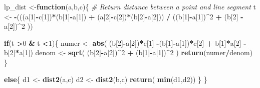 \documentclass[
]{article}
\newenvironment{Shaded}{\begin{snugshade}}{\end{snugshade}}
\newcommand{\CommentTok}[1]{\textcolor[rgb]{0.56,0.35,0.01}{\textit{#1}}}
\newcommand{\ControlFlowTok}[1]{\textcolor[rgb]{0.13,0.29,0.53}{\textbf{#1}}}
\newcommand{\DecValTok}[1]{\textcolor[rgb]{0.00,0.00,0.81}{#1}}
\newcommand{\KeywordTok}[1]{\textcolor[rgb]{0.13,0.29,0.53}{\textbf{#1}}}
\newcommand{\NormalTok}[1]{#1}
\newcommand{\OperatorTok}[1]{\textcolor[rgb]{0.81,0.36,0.00}{\textbf{#1}}}
\newcommand{\StringTok}[1]{\textcolor[rgb]{0.31,0.60,0.02}{#1}}
\begin{document}
\begin{Shaded}
\begin{Highlighting}[]
{\NormalTok{     lp_dist <-}\ControlFlowTok{function}\NormalTok{(a,b,c)\{ }
                               \CommentTok{# Return distance between a point and line segment }
\NormalTok{                               t <-}\StringTok{ }\OperatorTok{-}\NormalTok{(((a[}\DecValTok{1}\NormalTok{]}\OperatorTok{-}\NormalTok{c[}\DecValTok{1}\NormalTok{])}\OperatorTok{*}\NormalTok{(b[}\DecValTok{1}\NormalTok{]}\OperatorTok{-}\NormalTok{a[}\DecValTok{1}\NormalTok{]) }\OperatorTok{+}\StringTok{ }\NormalTok{(a[}\DecValTok{2}\NormalTok{]}\OperatorTok{-}\NormalTok{c[}\DecValTok{2}\NormalTok{])}\OperatorTok{*}\NormalTok{(b[}\DecValTok{2}\NormalTok{]}\OperatorTok{-}\NormalTok{a[}\DecValTok{2}\NormalTok{])) }\OperatorTok{/}\StringTok{ }\NormalTok{((b[}\DecValTok{1}\NormalTok{]}\OperatorTok{-}\NormalTok{a[}\DecValTok{1}\NormalTok{])}\OperatorTok{^}\DecValTok{2} \OperatorTok{+}\StringTok{ }\NormalTok{(b[}\DecValTok{2}\NormalTok{] }\OperatorTok{-}\StringTok{ }\NormalTok{a[}\DecValTok{2}\NormalTok{])}\OperatorTok{^}\DecValTok{2}\NormalTok{ ))}
    
                               \ControlFlowTok{if}\NormalTok{(t }\OperatorTok{>}\DecValTok{0} \OperatorTok{&}\StringTok{ }\NormalTok{t }\OperatorTok{<}\DecValTok{1}\NormalTok{)\{    }
\NormalTok{                                numer <-}\StringTok{ }\KeywordTok{abs}\NormalTok{(  (b[}\DecValTok{2}\NormalTok{]}\OperatorTok{-}\NormalTok{a[}\DecValTok{2}\NormalTok{])}\OperatorTok{*}\NormalTok{c[}\DecValTok{1}\NormalTok{] }\OperatorTok{-}\NormalTok{(b[}\DecValTok{1}\NormalTok{]}\OperatorTok{-}\NormalTok{a[}\DecValTok{1}\NormalTok{])}\OperatorTok{*}\NormalTok{c[}\DecValTok{2}\NormalTok{] }\OperatorTok{+}\StringTok{ }\NormalTok{b[}\DecValTok{1}\NormalTok{]}\OperatorTok{*}\NormalTok{a[}\DecValTok{2}\NormalTok{] }\OperatorTok{-}\StringTok{ }\NormalTok{b[}\DecValTok{2}\NormalTok{]}\OperatorTok{*}\NormalTok{a[}\DecValTok{1}\NormalTok{])}
\NormalTok{                                denom <-}\StringTok{ }\KeywordTok{sqrt}\NormalTok{( (b[}\DecValTok{2}\NormalTok{]}\OperatorTok{-}\NormalTok{a[}\DecValTok{2}\NormalTok{])}\OperatorTok{^}\DecValTok{2}   \OperatorTok{+}\StringTok{ }\NormalTok{(b[}\DecValTok{1}\NormalTok{]}\OperatorTok{-}\NormalTok{a[}\DecValTok{1}\NormalTok{])}\OperatorTok{^}\DecValTok{2}\NormalTok{ ) }
                                \KeywordTok{return}\NormalTok{(numer}\OperatorTok{/}\NormalTok{denom)  }
\NormalTok{                                 \}}
    
                               \ControlFlowTok{else}\NormalTok{\{}
\NormalTok{                                d1 <-}\StringTok{ }\KeywordTok{dist2}\NormalTok{(a,c)}
\NormalTok{                                d2 <-}\StringTok{ }\KeywordTok{dist2}\NormalTok{(b,c)   }
                                \KeywordTok{return}\NormalTok{( }\KeywordTok{min}\NormalTok{(d1,d2))                              }
\NormalTok{                                 \}                                                }
\NormalTok{                               \}}
    
}
\end{Highlighting}
\end{Shaded}
\end{document}
